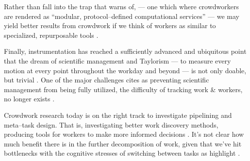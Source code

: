 \documentclass[trackingWork]{subfiles}
\begin{document}
Rather than fall into the trap that \citeauthor{irani2015cultural} warns of,
--- one which where crowdworkers are rendered as
``modular, protocol--defined computational services'' ---
we may yield better results from crowdwork if we think of workers as similar to
specialized, repurposable tools
\cite{irani2015cultural}.
 
Finally, instrumentation has reached a sufficiently advanced and ubiquitous point that
the dream of scientific management and Taylorism
--- to measure every motion at every point throughout the workday and beyond ---
is not only doable, but trivial
\cite{waltz2012quantified}.
One of the major challenges \citeauthor{10.2307/23702539} cites as
preventing scientific management from being fully utilized,
the difficulty of tracking work \& workers, no longer exists
\cite{10.2307/23702539}.



\subsubsubsection{\implication}
Crowdwork research today is on the right track to investigate pipelining and meta--task design.
That is, investigating better work discovery methods, producing tools for workers to make more informed decisions
\cite[see, for example,][]{turkopticon}.
It's not clear how much benefit there is in the further decomposition of work,
given that we've hit bottlenecks with the cognitive stresses of switching between tasks
as \citeauthor{delayAndOrderLasecki} highlight
\cite{delayAndOrderLasecki}.

\onlyinsubfile{
  \balance{}
  \printbibliography
  
  }



    

    


\end{document}
